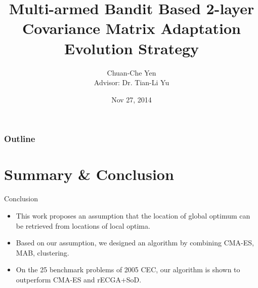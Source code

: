 \documentclass{beamer}
\title[MAB-based CMA-ES]{Multi-armed Bandit Based 2-layer Covariance Matrix Adaptation
Evolution Strategy}
\author[Chuan-Che Yen]{Chuan-Che Yen \\Advisor: Dr. Tian-Li Yu}
\institute{TEILab}
\date{Nov 27, 2014}
\begin{document}
\begin{frame}
  \titlepage
\end{frame}
\begin{frame}
  \frametitle{Outline}
  \tableofcontents[
    currentsubsection,
    sectionstyle=show/show,
    subsectionstyle=show/hide,
  ]
\end{frame}








%

\section{Summary \& Conclusion}
\begin{frame}{Conclusion}
  \begin{itemize}
    \item This work proposes an assumption that the location of global
      optimum can be retrieved from locations of local optima.
      \vspace*{14pt}
    \item Based on our assumption, we designed an algorithm by
      combining  CMA-ES, MAB, clustering.
      \vspace*{14pt}
    \item On the 25 benchmark problems of 2005 CEC, our algorithm is shown to
      outperform CMA-ES and rECGA+SoD.
  \end{itemize}
\end{frame}
\end{document}
